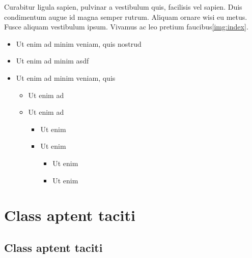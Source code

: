 Curabitur ligula sapien, pulvinar a vestibulum quis, facilisis vel sapien. Duis condimentum augue id magna semper rutrum. Aliquam ornare wisi eu metus. Fusce aliquam vestibulum ipsum. Vivamus ac leo pretium faucibus\ref{img:index}.

\begin{itemize}
    \item Ut enim ad minim veniam, quis nostrud
    \item Ut enim ad minim asdf
    \item Ut enim ad minim veniam, quis
          \begin{itemize}
              \item Ut enim ad
              \item Ut enim ad
                    \begin{itemize}
                        \item Ut enim
                        \item Ut enim
                              \begin{itemize}
                                  \item Ut enim
                                  \item Ut enim
                              \end{itemize}
                    \end{itemize}
          \end{itemize}
\end{itemize}

\section{Class aptent taciti}

\lipsum[2]

\subsection{Class aptent taciti}

\lipsum[6-7]

